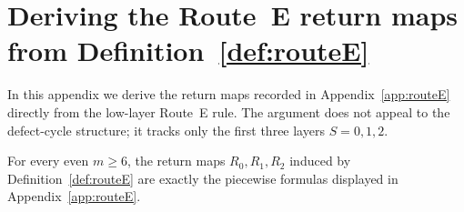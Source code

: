 \section{Deriving the Route~E return maps from Definition~\ref{def:routeE}}\label{app:routeE-derivation}

In this appendix we derive the return maps recorded in Appendix~\ref{app:routeE} directly from the low-layer Route~E rule.
The argument does not appeal to the defect-cycle structure; it tracks only the first three layers $S=0,1,2$.

\begin{proposition}\label{prop:routeE-return-formulas}
For every even $m\ge 6$, the return maps $R_0,R_1,R_2$ induced by Definition~\ref{def:routeE} are exactly the piecewise formulas displayed in Appendix~\ref{app:routeE}.
\end{proposition}

